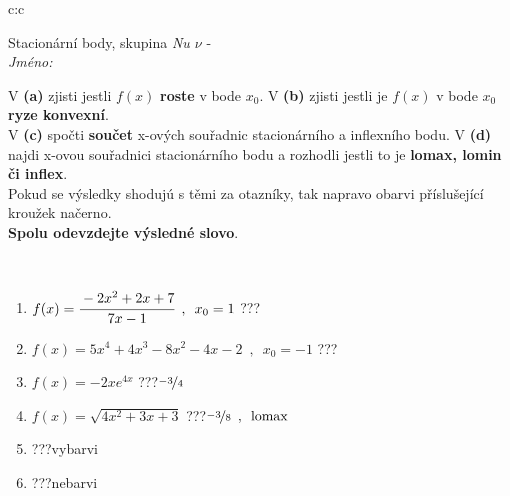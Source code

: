 \documentclass[10pt]{report}
\begin{document}
\newpage
\thispagestyle{empty}
\begin{tabular}{c:c}
\begin{minipage}[c][104.5mm][t]{0.5\linewidth}
\begin{center}
\vspace{7mm}
{\huge Stacionární body, skupina \textit{Nu $\nu$} -}\\[5mm]
\textit{Jméno:}\phantom{xxxxxxxxxxxxxxxxxxxxxxxxxxxxxxxxxxxxxxxxxxxxxxxxxxxxxxxxxxxxxxxxx}\\[5mm]
\begin{minipage}{0.95\linewidth}
\begin{center}
{\small V \textbf{(a)} zjisti jestli $f(x)$ \textbf{roste} v bode $x_0$. V \textbf{(b)} zjisti jestli je $f(x)$ v bode $x_0$ \textbf{ryze konvexní}.\\V \textbf{(c)} spočti \textbf{součet} x-ových souřadnic stacionárního a inflexního bodu. V \textbf{(d)} najdi x-ovou souřadnici stacionárního bodu a rozhodli jestli to je \textbf{lomax, lomin či inflex}.\\Pokud se výsledky shodujú s těmi za otazníky, tak napravo obarvi příslušející kroužek načerno.\\\textbf{Spolu odevzdejte výsledné slovo}}.
\end{center}
\end{minipage}
\\[1mm]
\begin{minipage}{0.79\linewidth}
\begin{center}
\begin{varwidth}{\linewidth}
\begin{enumerate}
\normalsize
\item $f(x)=\cfrac{-2x^2+2x+7}{7x-1}\enspace , \enspace x_0=1$\quad \dotfill\; ???\;\dotfill \quad {}
\item $f(x)=5x^4+4x^3-8x^2-4x-2\enspace , \enspace x_0=-1$\quad \dotfill\; ???\;\dotfill \quad {}
\item $f(x)=-2xe^{4x}$\quad \dotfill\; ???\;\dotfill \quad $\nicefrac{-3}{4}$
\item $f(x)=\sqrt{4x^2+3x+3}$\quad \dotfill\; ???\;\dotfill \quad $\nicefrac{-3}{8}\enspace , \enspace\mathrm{lomax}$
\item \quad \dotfill\; ???\;\dotfill \quad vybarvi
\item \quad \dotfill\; ???\;\dotfill \quad nebarvi
\end{enumerate}
\end{varwidth}
\end{center}

\end{minipage}
\end{center}
\end{minipage}
\end{tabular}
\end{document}
